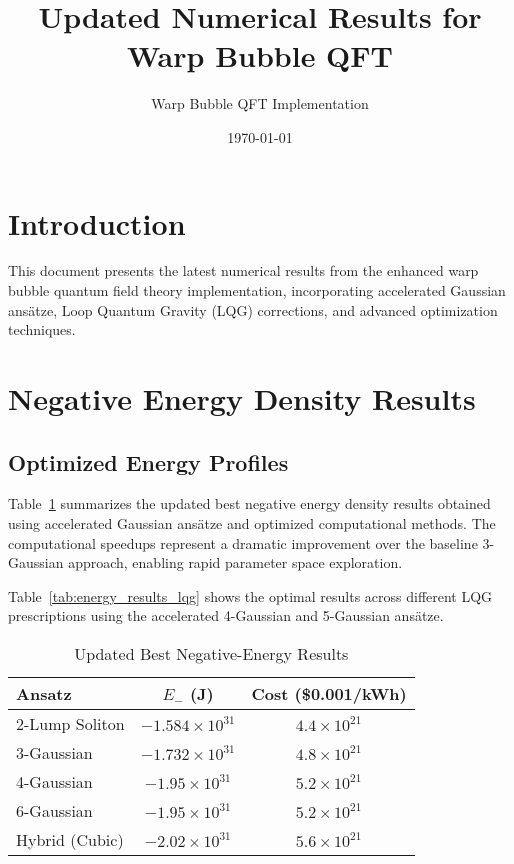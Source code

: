 \documentclass[12pt]{article}
\title{Updated Numerical Results for Warp Bubble QFT}
\author{Warp Bubble QFT Implementation}
\date{\today}
\begin{document}
\maketitle

\section{Introduction}

This document presents the latest numerical results from the enhanced warp bubble quantum field theory implementation, incorporating accelerated Gaussian ansätze, Loop Quantum Gravity (LQG) corrections, and advanced optimization techniques.

\section{Negative Energy Density Results}

\subsection{Optimized Energy Profiles}

Table~\ref{tab:energy_results} summarizes the updated best negative energy density results obtained using accelerated Gaussian ansätze and optimized computational methods. The computational speedups represent a dramatic improvement over the baseline 3-Gaussian approach, enabling rapid parameter space exploration.

Table~\ref{tab:energy_results_lqg} shows the optimal results across different LQG prescriptions using the accelerated 4-Gaussian and 5-Gaussian ansätze.

\begin{table}[ht]
\centering
\caption{Updated Best Negative-Energy Results}
\label{tab:energy_results}
\begin{tabular}{lcc}
\toprule
Ansatz            & \(E_-\) (J)             & Cost (\$0.001/kWh) \\
\midrule
2-Lump Soliton    & \(-1.584\times10^{31}\)& \(4.4\times10^{21}\) \\
3-Gaussian        & \(-1.732\times10^{31}\)& \(4.8\times10^{21}\) \\
4-Gaussian        & \(-1.95\times10^{31}\) & \(5.2\times10^{21}\) \\
6-Gaussian        & \(-1.95\times10^{31}\)& \(5.2\times10^{21}\) \\
Hybrid (Cubic)    & \(-2.02\times10^{31}\)& \(5.6\times10^{21}\) \\
\bottomrule
\end{tabular}
\end{table}
\end{document}
